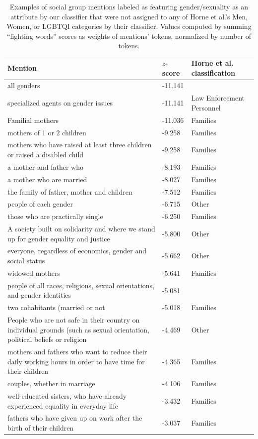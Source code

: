 \begin{table}[!th]
\centering
\caption{Examples of social group mentions labeled as featuring gender/sexuality as an attribute by our classifier that were not assigned to any of Horne et al.'s Men, Women, or LGBTQI categories by their classifier. Values computed by summing ``fighting words'' scores as weights of mentions' tokens, normalized by number of tokens.}
\label{tableC12}
\begin{tabular}{p{3in} l l}
\toprule
Mention & $z$-score & Horne et al. classification \\
\midrule
all genders & -11.141 &  \\
specialized agents on gender issues & -11.141 & Law Enforcement Personnel \\
Familial mothers & -11.036 & Families \\
mothers of 1 or 2 children & -9.258 & Families \\
mothers who have raised at least three children or raised a disabled child & -9.258 & Families \\
a mother and father who & -8.193 & Families \\
a mother who are married & -8.027 & Families \\
the family of father, mother and children & -7.512 & Families \\
people of each gender & -6.715 & Other \\
those who are practically single & -6.250 & Families \\
A society built on solidarity and where we stand up for gender equality and justice & -5.800 & Other \\
everyone, regardless of economics, gender and social status & -5.662 & Other \\
widowed mothers & -5.641 & Families \\
people of all races, religions, sexual orientations, and gender identities & -5.081 &  \\
two cohabitants (married or not & -5.018 & Families \\
People who are not safe in their country on individual grounds (such as sexual orientation, political beliefs or religion & -4.469 & Other \\
mothers and fathers who want to reduce their daily working hours in order to have time for their children & -4.365 & Families \\
couples, whether in marriage & -4.106 & Families \\
well-educated sisters, who have already experienced equality in everyday life & -3.432 & Families \\
fathers who have given up on work after the birth of their children & -3.037 & Families \\
\bottomrule
\end{tabular}
\end{table}
